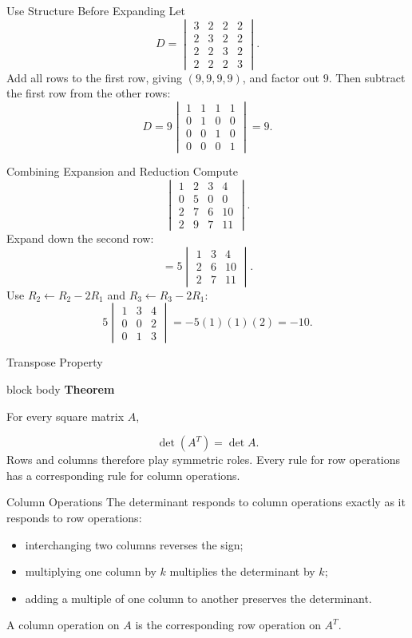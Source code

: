 \documentclass[aspectratio=169]{beamer}
\newcommand{\theorembox}[2]{%
  \begin{beamercolorbox}[sep=1.2ex,wd=\linewidth]{block body}
    \textbf{#1}\par #2
  \end{beamercolorbox}}
\begin{document}
\begin{frame}{Use Structure Before Expanding}
Let
\[
D=\begin{vmatrix}
3&2&2&2\\2&3&2&2\\2&2&3&2\\2&2&2&3
\end{vmatrix}.
\]
Add all rows to the first row, giving $(9,9,9,9)$, and factor out $9$.
Then subtract the first row from the other rows:
\[
D=9\begin{vmatrix}
1&1&1&1\\0&1&0&0\\0&0&1&0\\0&0&0&1
\end{vmatrix}=\boxed{9}.
\]
\end{frame}

\begin{frame}{Combining Expansion and Reduction}
Compute
\[
\begin{vmatrix}
1&2&3&4\\0&5&0&0\\2&7&6&10\\2&9&7&11
\end{vmatrix}.
\]
Expand down the second row:
\[
=5\begin{vmatrix}1&3&4\\2&6&10\\2&7&11\end{vmatrix}.
\]
Use $R_2\leftarrow R_2-2R_1$ and $R_3\leftarrow R_3-2R_1$:
\[
5\begin{vmatrix}1&3&4\\0&0&2\\0&1&3\end{vmatrix}
=-5(1)(1)(2)=\boxed{-10}.
\]
\end{frame}

\begin{frame}{Transpose Property}
\theorembox{Theorem}{For every square matrix $A$,}
\[
\boxed{\det(A^T)=\det A}.
\]
\pause
Rows and columns therefore play symmetric roles. Every rule for row operations has a corresponding rule for column operations.
\end{frame}

\begin{frame}{Column Operations}
The determinant responds to column operations exactly as it responds to row operations:
\begin{itemize}
  \item interchanging two columns reverses the sign;
  \item multiplying one column by $k$ multiplies the determinant by $k$;
  \item adding a multiple of one column to another preserves the determinant.
\end{itemize}
\pause
A column operation on $A$ is the corresponding row operation on $A^T$.
\end{frame}
\end{document}

